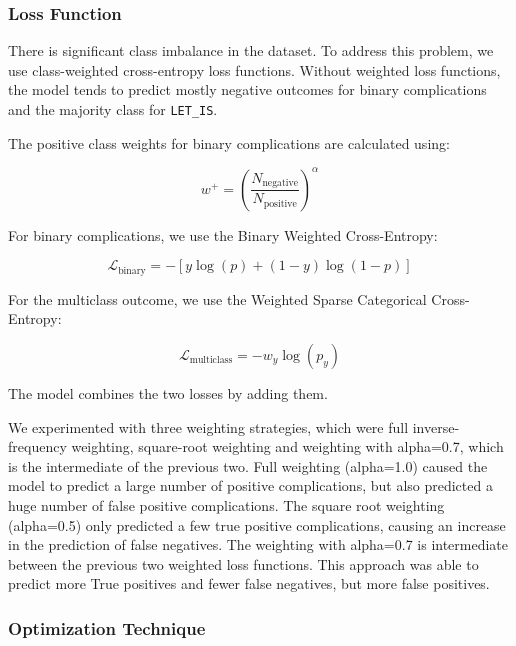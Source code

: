 \documentclass[11pt]{article}
\begin{document}
\subsubsection{Loss Function}

There is significant class imbalance in the dataset. To address this problem, we use class-weighted cross-entropy loss functions. Without weighted loss functions, the model tends to predict mostly negative outcomes for binary complications and the majority class for \texttt{LET\_IS}.

The positive class weights for binary complications are calculated using:

\begin{equation}
    w^{+} = \left(\frac{N_{\text{negative}}}{N_{\text{positive}}}\right)^{\alpha}
\end{equation}

For binary complications, we use the Binary Weighted Cross-Entropy:

\begin{equation}
    \mathcal{L}_{\text{binary}} =
    -\left[
    y\log(p) + (1-y)\log(1-p)
    \right]
\end{equation}

For the multiclass outcome, we use the Weighted Sparse Categorical Cross-Entropy:

\begin{equation}
    \mathcal{L}_{\text{multiclass}}
    = -w_y\log(p_y)
\end{equation}

The model combines the two losses by adding them.

We experimented with three weighting strategies, which were full inverse-frequency weighting, square-root weighting and weighting with alpha=0.7, which is the intermediate of the previous two. Full weighting (alpha=1.0) caused the model to predict a large number of positive complications, but also predicted a huge number of false positive complications. The square root weighting (alpha=0.5) only predicted a few true positive complications, causing an increase in the prediction of false negatives. The weighting with alpha=0.7 is intermediate between the previous two weighted loss functions. This approach was able to predict more True positives and fewer false negatives, but more false positives.

\subsubsection{Optimization Technique}
\end{document}
